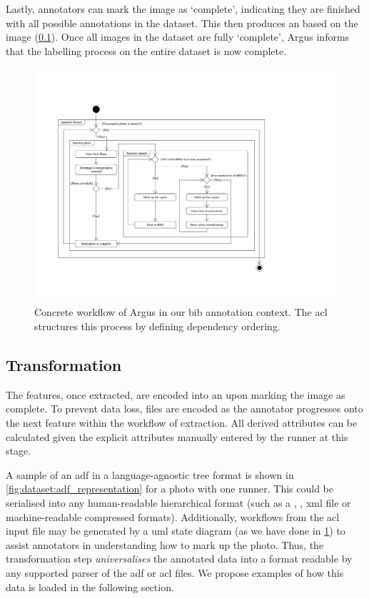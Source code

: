Lastly, annotators can mark the image as `complete', indicating they are finished with all possible annotations in the dataset. This then produces an  based on the image (\cref{sec:dataset:process:transformation}). Once all images in the dataset are fully `complete', Argus informs that the labelling process on the entire dataset is now complete.

\begin{landscape}
\begin{figure}[p]
  \centering
  \includegraphics[width=0.9\paperwidth]{images/dataset/concrete_workflow}
  \caption[Concrete workflow example using Argus]{Concrete workflow of Argus in our bib annotation context. The \gls{acl} structures this process by defining dependency ordering.}
  \label{fig:dataset:process:argus_workflow}
\end{figure}
\end{landscape}

\subsection{Transformation}
\label{sec:dataset:process:transformation}

The features, once extracted, are encoded into an  upon marking the image as complete. To prevent data loss, files are encoded as the annotator progresses onto the next feature within the workflow of extraction. All derived attributes can be calculated given the explicit attributes manually entered by the runner at this stage.

A sample of an \gls{adf} in a language-agnostic tree format is shown in \cref{fig:dataset:adf_representation} for a photo with one runner. This could be serialised into any human-readable hierarchical format (such as a , , \gls{xml} file or machine-readable compressed formats). Additionally, workflows from the \gls{acl} input file may be generated by a \gls{uml} state diagram (as we have done in \cref{fig:dataset:process:argus_workflow}) to assist annotators in understanding how to mark up the photo. Thus, the transformation step \textit{universalises} the annotated data into a format readable by any supported parser of the \gls{adf} or \gls{acl} files. We propose examples of how this data is loaded in the following section.

